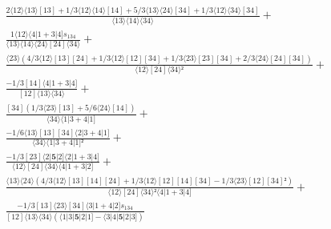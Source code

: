 \documentclass[varwidth, border=5pt]{standalone}
\begin{document}
\begin{my}
$\begin{gathered}
\scriptscriptstyle\frac{2⟨12⟩⟨13⟩[13]+1/3⟨12⟩⟨14⟩[14]+5/3⟨13⟩⟨24⟩[34]+1/3⟨12⟩⟨34⟩[34]}{⟨13⟩⟨14⟩⟨34⟩} +\\
\scriptscriptstyle\frac{1⟨12⟩⟨4|1+3|4]s_{134}}{⟨13⟩⟨14⟩⟨24⟩[24]⟨34⟩} +\\
\scriptscriptstyle\frac{⟨23⟩(4/3⟨12⟩[13][24]+1/3⟨12⟩[12][34]+1/3⟨23⟩[23][34]+2/3⟨24⟩[24][34])}{⟨12⟩[24]⟨34⟩²} +\\
\scriptscriptstyle\frac{-1/3[14]⟨4|1+3|4]}{[12]⟨13⟩⟨34⟩} +\\
\scriptscriptstyle\frac{[34](1/3⟨23⟩[13]+5/6⟨24⟩[14])}{⟨34⟩⟨1|3+4|1]} +\\
\scriptscriptstyle\frac{-1/6⟨13⟩[13][34]⟨2|3+4|1]}{⟨34⟩⟨1|3+4|1]²} +\\
\scriptscriptstyle\frac{-1/3[23]⟨2|𝟓|2]⟨2|1+3|4]}{⟨12⟩[24]⟨34⟩⟨4|1+3|2]} +\\
\scriptscriptstyle\frac{⟨13⟩⟨24⟩(4/3⟨12⟩[13][14][24]+1/3⟨12⟩[12][14][34]-1/3⟨23⟩[12][34]²)}{⟨12⟩[24]⟨34⟩²⟨4|1+3|4]} +\\
\scriptscriptstyle\frac{-1/3[13]⟨23⟩[34]⟨3|1+4|2]s_{134}}{[12]⟨13⟩⟨34⟩(⟨1|3|𝟓|2|1]-⟨3|4|𝟓|2|3])} \phantom{+}
\end{gathered}$
\end{my}
\end{document}
